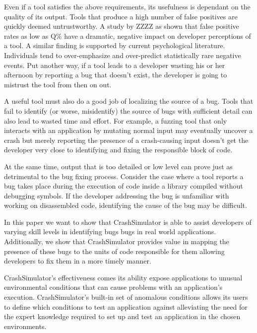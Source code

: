 Even if a tool satisfies the above requirements, its usefulness is
dependant on the quality of its output.  Tools that produce a high number
of false positives are quickly deemed untrustworthy.  A study by ZZZZ as
shown that false positive rates as low as Q\% have a dramatic, negative
impact on developer perceptions of a tool.    A similar
finding is supported by current psychological literature.  Individuals tend
to over-emphasize and over-predict statistically rare negative
events.  Put another way, if a tool leads to a developer
wasting his or her afternoon by reporting a bug that doesn't exist, the
developer is going to mistrust the tool from then on out.

A useful tool must also do a good job of localizing the source of a bug.
Tools that fail to identify (or worse, misidentify) the source of bugs with
sufficient detail can also lead to wasted time and effort.  For example, a
fuzzing tool that only interacts with an application by mutating normal
input may eventually uncover a crash but merely reporting the presence of a
crash-causing input doesn't get the developer very close to identifying and
fixing the responsible block of code.

At the same time, output that is too detailed or low level can prove just
as detrimental to the bug fixing process.  Consider the case where a tool
reports a bug takes place during the execution of code inside a library
compiled without debugging symbols.  If the developer addressing the bug is
unfamiliar with working on disassembled code, identifying the cause of the
bug may be difficult.

In this paper we want to show that CrashSimulator is able to assist
developers of varying skill levels in identifying bugs bugs in real world
applications.  Additionally, we show that CrashSimulator provides value in
mapping the presence of these bugs to the units of code responsible for
them allowing developers to fix them in a more timely manner.

CrashSimulator's effectiveness comes its ability expose applications to
unusual environmental conditions that can cause problems with an
application's execution.  CrashSimulator's built-in set of anomalous
conditions allows its users to define which conditions to test an
application against alleviating the need for the expert knowledge required
to set up and test an application in the chosen environments.

